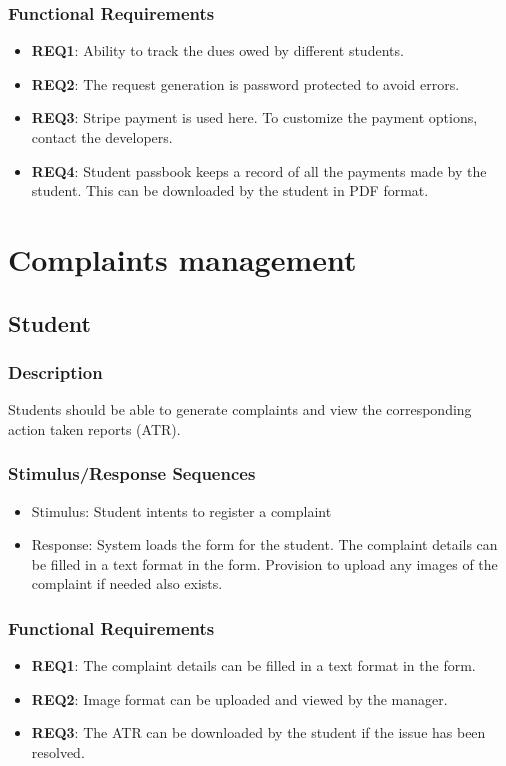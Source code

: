 \documentclass{scrreprt}
\begin{document}
\subsubsection{Functional Requirements}
\begin{itemize}
    \item \textbf{REQ1}: Ability to track the dues owed by different students.
    \item \textbf{REQ2}: The request generation is password protected to avoid errors.
    \item \textbf{REQ3}: Stripe payment is used here. To customize the payment options, contact the developers.
    \item \textbf{REQ4}: Student passbook keeps a record of all the payments made by the student. This can be downloaded by the student in PDF format.
\end{itemize}


\section{Complaints management}
\subsection{Student}
\subsubsection{Description}
Students should be able to generate complaints and view the corresponding action taken reports (ATR).
\subsubsection{Stimulus/Response Sequences}
\begin{itemize}
    \item Stimulus: Student intents to register a complaint  
    \item Response: System loads the form for the student. The complaint details can be filled in a text format in the form. Provision to upload any images of the complaint if needed also exists. 
\end{itemize}

\subsubsection{Functional Requirements}
\begin{itemize}
    \item \textbf{REQ1}: The complaint details can be filled in a text format in the form.
    \item \textbf{REQ2}: Image format can be uploaded and viewed by the manager.
    \item \textbf{REQ3}: The ATR can be downloaded by the student if the issue has been resolved.
\end{itemize}
\end{document}
